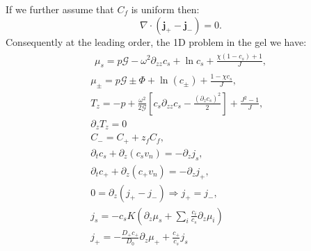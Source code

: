 \documentclass[12pt]{extarticle}
\begin{document}
If we further assume that $C_f$ is uniform then:
\begin{equation}
\nabla\cdot(\mathbf{j}_+-\mathbf{j}_-)= 0.
\end{equation}
Consequently at the leading order, the 1D problem in the gel we have:
\begin{gather}
\begin{aligned}
\mu_s = p \mathcal{G}  - \omega^2\partial_{zz} c_s+ \ln c_s+\frac{\chi(1-c_s)+1}{J},
\end{aligned}\\
\mu_\pm = p \mathcal{G} \pm \Phi + \ln (c_\pm) +\frac{1-\chi c_s}{J} ,\\
T_z= -p +\frac{\omega^2}{2\mathcal{G}} \left[c_s\partial_{zz}c_s-\frac{(\partial_z c_s)^2}{2}\right] +\frac{J^2-1}{J},\\
\partial_z T_z=0\\
C_- = C_+ + z_f C_f,\\
\partial_t c_s + \partial_z (c_s v_n)=- \partial_z j_s,\\
\partial_t c_+ +\partial_z (c_+ v_n)= -\partial_zj_+,\\
0= \partial_z(j_+-j_-) \Rightarrow j_+=j_-,\\
j_s =-c_sK  \left(\partial_z\mu_s +\sum_i \frac{c_i}{c_s} \partial_z \mu_i\right)\\
j_+= - \frac{D_+ c_+}{D_0}\partial_z \mu_+ + \frac{c_+}{c_s}j_s
\end{gather}
\end{document}
